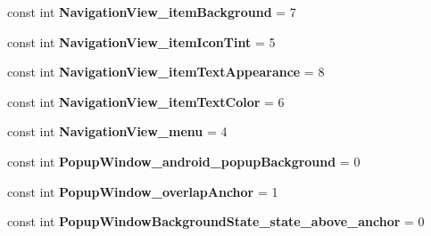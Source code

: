 \begin{DoxyCompactItemize}
\mbox{\label{class_sample_app_1_1_droid_1_1_resource_1_1_styleable_a8cec4a74a2047329c2dfa45c5f49157e}} 
const int {\bfseries Navigation\+View\+\_\+item\+Background} = 7
\item 
\mbox{\label{class_sample_app_1_1_droid_1_1_resource_1_1_styleable_a01f3cf581ccbc1cc71a59ee4332af520}} 
const int {\bfseries Navigation\+View\+\_\+item\+Icon\+Tint} = 5
\item 
\mbox{\label{class_sample_app_1_1_droid_1_1_resource_1_1_styleable_a0264db3f70c447b3855bf6856f6a2d45}} 
const int {\bfseries Navigation\+View\+\_\+item\+Text\+Appearance} = 8
\item 
\mbox{\label{class_sample_app_1_1_droid_1_1_resource_1_1_styleable_aee84b335bf7ed98d22080eabd34ae7c2}} 
const int {\bfseries Navigation\+View\+\_\+item\+Text\+Color} = 6
\item 
\mbox{\label{class_sample_app_1_1_droid_1_1_resource_1_1_styleable_a15bd54ac28876fb069698b773e7f2f80}} 
const int {\bfseries Navigation\+View\+\_\+menu} = 4
\item 
\mbox{\label{class_sample_app_1_1_droid_1_1_resource_1_1_styleable_ad3bee18246ae2ea70c81abfa13d02575}} 
const int {\bfseries Popup\+Window\+\_\+android\+\_\+popup\+Background} = 0
\item 
\mbox{\label{class_sample_app_1_1_droid_1_1_resource_1_1_styleable_a09e5ebc26c4ed254dbe7675e2dd3fbca}} 
const int {\bfseries Popup\+Window\+\_\+overlap\+Anchor} = 1
\item 
\mbox{\label{class_sample_app_1_1_droid_1_1_resource_1_1_styleable_ab2cbd2237f92558bf882c98d237eb1ea}} 
const int {\bfseries Popup\+Window\+Background\+State\+\_\+state\+\_\+above\+\_\+anchor} = 0
\item 
\mbox{\label{class_sample_app_1_1_droid_1_1_resource_1_1_styleable_a3390b56472b4498ffb52bb17ec94adf3}} 

\end{DoxyCompactItemize}
